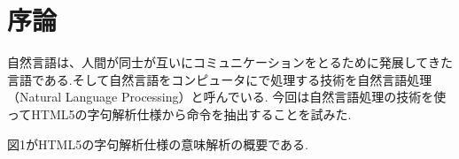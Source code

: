 \documentclass[uplatex,a4j]{jsreport}
\begin{document}
\chapter{序論}

自然言語は、人間が同士が互いにコミュニケーションをとるために発展してきた言語である.そして自然言語をコンピュータにで処理する技術を自然言語処理（Natural Language Processing）と呼んでいる.
今回は自然言語処理の技術を使ってHTML5の字句解析仕様から命令を抽出することを試みた.

図1がHTML5の字句解析仕様の意味解析の概要である.
\end{document}
